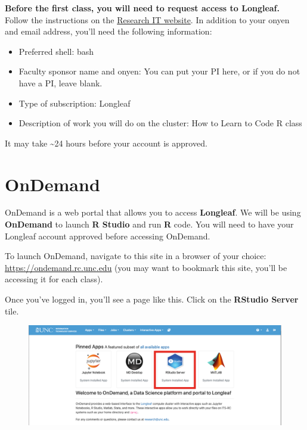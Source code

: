 \documentclass[
  letterpaper,
  DIV=11,
  numbers=noendperiod]{scrreprt}
\begin{document}
\textbf{Before the first class, you will need to request access to
Longleaf.} Follow the instructions on the
\href{https://help.rc.unc.edu/request-a-cluster-account}{Research IT
website}. In addition to your onyen and email address, you'll need the
following information:

\begin{itemize}
\item
  Preferred shell: bash
\item
  Faculty sponsor name and onyen: You can put your PI here, or if you do
  not have a PI, leave blank.
\item
  Type of subscription: Longleaf
\item
  Description of work you will do on the cluster: How to Learn to Code R
  class
\end{itemize}

It may take \textasciitilde24 hours before your account is approved.

\hypertarget{ondemand}{%
\section{OnDemand}\label{ondemand}}

OnDemand is a web portal that allows you to access \textbf{Longleaf}. We
will be using \textbf{OnDemand} to launch \textbf{R Studio} and run
\textbf{R} code. You will need to have your Longleaf account approved
before accessing OnDemand.

To launch OnDemand, navigate to this site in a browser of your choice:
\href{https://ondemand.rc.unc.edu/}{https://ondemand.rc.unc.edu} (you
may want to bookmark this site, you'll be accessing it for each class).

Once you've logged in, you'll see a page like this. Click on the
\textbf{RStudio Server} tile.

\begin{figure}

{\centering \includegraphics{scripts/00_intro/class0_images/Picture1.png}

}

\end{figure}
\end{document}
